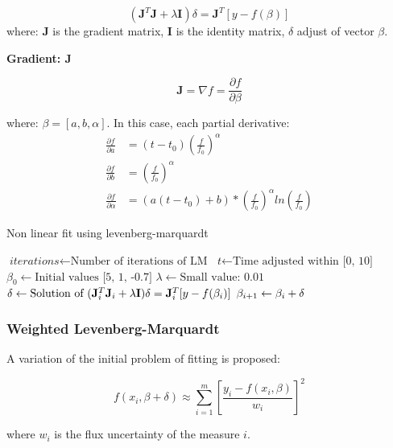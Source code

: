 \documentclass[10pt]{article}
\begin{document}
$$ (\mathbf{J}^{T}\mathbf{J} + \lambda\mathbf{I})\delta = \mathbf{J}^{T}[y - f(\beta)] $$
where: $\mathbf{J}$ is the gradient matrix, $\mathbf{I}$ is the identity matrix, $\delta$ adjust of vector $\beta$.


\noindent\textbf{Gradient: $\mathbf{J}$} 

$$ \mathbf{J} = \nabla f = \frac{\partial f}{\partial \beta} $$ 

where: $\beta = [a, b, \alpha]$. In this case, each partial derivative:
\begin{align*}
    \frac{\partial f}{\partial a}           &= (t - t_0)\left(\frac{f}{f_0}\right)^\alpha \\
    \frac{\partial f}{\partial b}           &= \left(\frac{f}{f_0}\right)^\alpha \\
    \frac{\partial f}{\partial \alpha}      &= (a(t-t_0)+b)*\left(\frac{f}{f_0}\right)^\alpha ln\left(\frac{f}{f_0}\right)
\end{align*}

\begin{algorithm}[H]
\caption{Non linear fit using levenberg-marquardt}\label{4months}
\begin{algorithmic}[1]
\State $\textit{iterations} \gets \text{Number of iterations of LM}$
\Statex
\State $\textit{t} \gets \text{Time adjusted within [0, 10]}$
\Statex
\State $\textit{$\beta_0$} \gets \text{Initial values [5, 1, -0.7]}$
\Statex
\State $\textit{$\lambda$} \gets \text{Small value: 0.01}$
\Statex
{}
\Statex
\State $\textit{$\delta$} \gets \text{Solution of $ (\mathbf{J}_i^{T}\mathbf{J}_i + \lambda\mathbf{I})\delta = \mathbf{J}_i^{T}[y - f(\beta_i)] $}$
\Statex
\State $\textit{$\beta_{i+1}$} \gets \text{$ \beta_i + \delta $}$
\Statex
\EndFor
\State {}
\EndProcedure
\end{algorithmic}
\end{algorithm}

\subsubsection{Weighted Levenberg-Marquardt}
A variation of the initial problem of fitting is proposed:

$$ f(x_i, \beta + \delta) \approx \sum\limits_{i=1}^m \left[\frac{y_i - f(x_i, \beta)}{w_i} \right]^2 $$

\noindent where $w_i$ is the flux uncertainty of the measure $i$.
\end{document}

